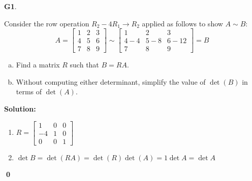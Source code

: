 \documentclass{article}
\newenvironment{problem}[1]
{
  \begin{flushleft}
  \textbf{#1}.
  \ignorespaces
}
{
  \end{flushleft}
}
\newenvironment{solution}
{
  \ignorespaces
  \textbf{Solution:}
}
{
  \ignorespacesafterend
  \begin{flushright}
  {\bfseries \qed}
  \end{flushright}
}
\begin{document}
\begin{problem}{G1}
Consider the row operation \(R_2-4R_1\to R_2\) applied as follows to show
\(A\sim B\):
\[
A=\begin{bmatrix}1&2&3\\4&5&6\\7&8&9\end{bmatrix}
  \sim
\begin{bmatrix}1&2&3\\4-4&5-8&6-12\\7&8&9\end{bmatrix}=B
\]
\begin{enumerate}[(a)]
\item Find a matrix \(R\) such that \(B=RA\).
\item Without computing either determinant,
      simplify the value of \(\det(B)\) in terms of \(\det(A)\).
\end{enumerate}
\end{problem}
\begin{solution}
\begin{enumerate}
\item \(R= \begin{bmatrix} 1 & 0 & 0 \\ -4 & 1 & 0 \\ 0 & 0 & 1 \end{bmatrix}\)
\item \(\det B =\det(RA)= \det(R)\det(A)=1\det A=\det A\)
\end{enumerate}
\end{solution}
\end{document}
